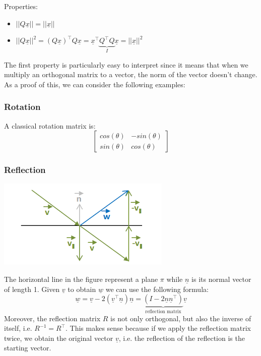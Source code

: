 Properties:
\begin{itemize}
    \item $||Q\underline{x}|| = ||\underline{x}||$
    \item $||Q\underline{x}||^2 = (Q\underline{x})^\intercal Q\underline{x} = \underline{x}^\intercal \underbrace{Q^\intercal Q}_{I} \underline{x} = ||\underline{x}||^2$
\end{itemize}
The first property is particularly easy to interpret since it means that when we multiply an orthogonal matrix to a vector, the norm of the vector doesn't change. As a proof of this, we can consider the following examples:

\subsubsection{Rotation}
A classical rotation matrix is:
\[
\begin{bmatrix}
    cos(\theta) & -sin(\theta)\\
    sin(\theta) & cos(\theta)
\end{bmatrix}    
\]
\subsubsection{Reflection}
\begin{center}
    \includegraphics[scale=0.5]{images/Reflection.png}
\end{center}
The horizontal line in the figure represent a plane $\pi$ while $\underline{n}$ is its normal vector of length 1. 
Given $\underline{v}$ to obtain $\underline{w}$ we can use the following formula:
\[
\underline{w} = \underline{v} - 2(\underline{v}^\intercal \underline{n})\underline{n} = \underbrace{(I - 2\underline{n}\underline{n}^\intercal)}_{\text{reflection matrix}}\underline{v}
\]
Moreover, the reflection matrix $R$ is not only orthogonal, but also the inverse of itself, i.e. $R^{-1} = R^\intercal$. This makes sense because if we apply the reflection matrix twice, we obtain the original vector $\underline{v}$, i.e. the reflection of the reflection is the starting vector.

